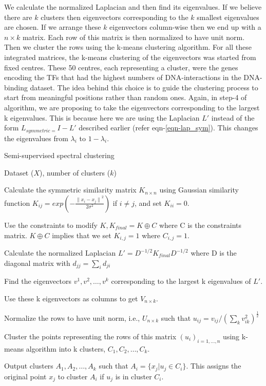 We calculate the normalized Laplacian and then find its eigenvalues. If we believe there are $k$ clusters then eigenvectors corresponding to the $k$ smallest eigenvalues are chosen. If we arrange these $k$ eigenvectors column-wise then we end up with a $n \times k$ matrix. Each row of this matrix is then normalized to have unit norm. Then we cluster the rows using the k-means clustering algorithm. For all these integrated matrices, the k-means clustering of the eigenvectors was started from fixed centres. These 50 centres, each representing a cluster, were the genes encoding the TFs that had the highest numbers of DNA-interactions in the DNA-binding dataset. The idea behind this choice is to guide the clustering process to start from meaningful positions rather than random ones. Again, in step-4 of algorithm, we are proposing to take the eigenvectors corresponding to the largest k eigenvalues. This is because here we are using the Laplacian $L'$ instead of the form $L_{symmetric=}I-L'$ described earlier (refer eqn-\ref{eqn-lap_sym}). This changes the eigenvalues from $\lambda_{i}$ to $1-\lambda_{i}$. 

\begin{algorithm}
\caption{Semi-supervised spectral clustering}
\label{alg:semi_sup_spectral_clustering}
\begin{algorithmic}[1]
\REQUIRE Dataset ($X$), number of clusters ($k$) 

\STATE Calculate the symmetric similarity matrix $K_{n \times n}$  using Gaussian similarity function  $K_{ij}=exp \left( -\frac{{\parallel x_{i}-x_{j} \parallel}^{2}}{2\sigma^{2}}\right)$ if $i\neq j$, and set $K_{ii}=0$. 

\STATE Use the constraints to modify $K, K_{final}=K \oplus C$ where C is the constraints matrix. $K \oplus C$ implies that we set $K_{i,j}=1$ where $C_{i,j}=1$. 

\STATE Calculate the normalized Laplacian $L'=D^{-1/2}K_{final}D^{-1/2}$ where D is the diagonal matrix with $d_{jj}=\sum_{i}d_{ji}$ 

\STATE Find the eigenvectors $v^{1},v^{2},\dots,v^{k}$ corresponding to the largest k eigenvalues of $L'$. 

\STATE Use these k eigenvectors as columns to get $V_{n \times k}$. 

\STATE Normalize the rows to have unit norm, i.e., $U_{n \times k}$ such that $u_{ij}= v_{ij}/(\sum_{k}{v_{ik}^{2}})^{\frac{1}{2}}$

\STATE Cluster the points representing the rows of this matrix $(u_{i})_{i=1,...,n}$ using k-means algorithm into k clusters, $C_{1},C_{2},\dots,C_{k}$.  

\STATE Output clusters $A_{1},A_{2},\dots,A_{k}$ such that $A_{i}=\{x_{j}|u_{j}\in C_{i}\}$. This assigns the original point $x_{j}$ to cluster $A_{i}$ if $u_{j}$ is in cluster $C_{i}$. 

\end{algorithmic}
\end{algorithm}

